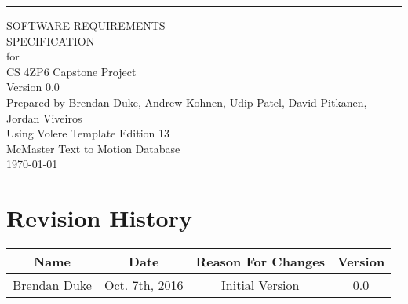 \documentclass{scrreprt}
\date{}
\def\myversion{0.0 }
\begin{document}
\begin{flushright}
    \rule{16cm}{5pt}\vskip1cm
    \begin{bfseries}
        \Huge{SOFTWARE REQUIREMENTS\\ SPECIFICATION}\\
        \vspace{1.4cm}
        for\\
        \vspace{1.4cm}
        CS 4ZP6 Capstone Project\\
        \vspace{1.4cm}
        \LARGE{Version \myversion}\\
        \vspace{1.4cm}
        Prepared by Brendan Duke, Andrew Kohnen, Udip Patel, David Pitkanen, Jordan Viveiros\\
        \vspace{1.4cm}
        Using Volere Template Edition 13\\
        \vspace{1.4cm}
        McMaster Text to Motion Database\\
        \vspace{1.4cm}
        \today\\
    \end{bfseries}
\end{flushright}

\tableofcontents

\chapter*{Revision History}

\begin{center}
    \begin{tabular}{|c|c|c|c|}
        \hline
            Name & Date & Reason For Changes & Version\\
        \hline
	    Brendan Duke & Oct. 7th, 2016 & Initial Version & 0.0\\
        \hline
    \end{tabular}
\end{center}

\end{document}
